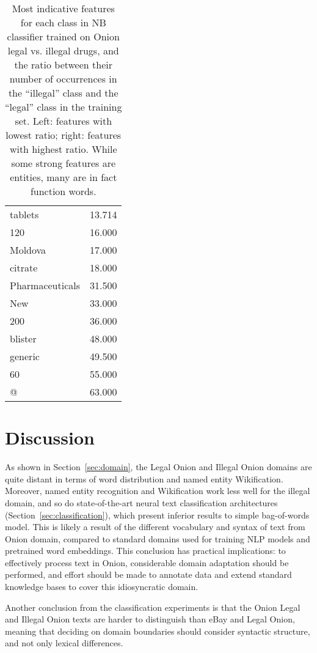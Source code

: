 \documentclass[11pt,a4paper,table]{article}
\begin{document}
\begin{table}[t]
\begin{tabular}{p{21mm}r}
tablets & 13.714\\
120 & 16.000\\
Moldova & 17.000\\
citrate & 18.000\\
Pharmaceuticals & 31.500\\
New & 33.000\\
200 & 36.000\\
blister & 48.000\\
generic & 49.500\\
60 & 55.000\\
@ & 63.000\\
\end{tabular}
\caption{Most indicative features for each class in NB classifier
trained on Onion legal vs. illegal drugs,
and the ratio between their number of occurrences in the ``illegal''
class and the ``legal'' class in the training set.
Left: features with lowest ratio; right: features with highest ratio.
While some strong features are entities, many are in fact function words.
\label{tab:nb_weights}}
\end{table}


\section{Discussion} \label{sec:discussion}

  As shown in Section~\ref{sec:domain}, the Legal Onion and Illegal Onion domains
  are quite distant in terms of word distribution and named entity Wikification.
  Moreover, named entity recognition and Wikification work less well
  for the illegal domain, and so do state-of-the-art neural text classification architectures (Section~\ref{sec:classification}),
  which present inferior results to simple bag-of-words model. This is likely a result of the different vocabulary and syntax
  of text from Onion domain, compared to standard domains used for training NLP models and pretrained word embeddings.
  This conclusion has practical implications: to effectively process text in Onion, considerable domain adaptation should be performed,
  and effort should be made to annotate data and extend standard knowledge bases to cover this idiosyncratic domain.

  Another conclusion from the classification experiments is that
  the Onion Legal and Illegal Onion texts are harder to distinguish than
  eBay and Legal Onion, meaning that deciding on domain boundaries should consider syntactic structure, and not only lexical differences.
\end{document}
